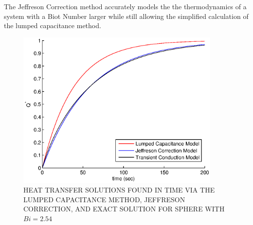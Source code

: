 The Jeffreson Correction method accurately models the the thermodynamics of a system with a Biot Number larger while still allowing the simplified calculation of the lumped capacitance method.

\begin{figure}[ht]
	\begin{center}
		\includegraphics[width=4in]{chapters/figures/Qvstime_lc_jc_tg} 
	\end{center}
	\caption[Heat transfer solutions with correction for single sphere]{HEAT TRANSFER SOLUTIONS FOUND IN TIME VIA THE LUMPED CAPACITANCE METHOD, JEFFRESON CORRECTION, AND EXACT SOLUTION FOR SPHERE WITH $Bi=2.54$}
	\label{qvstime_lc_jc_tg} 
\end{figure}